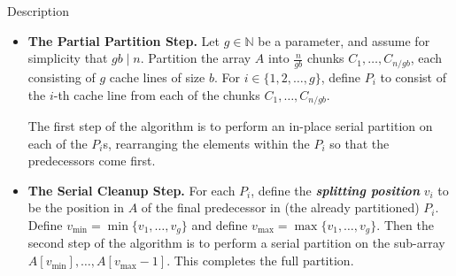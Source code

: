 \documentclass{beamer}
\newcommand{\defn}[1]       {{\textit{\textbf{\boldmath #1}}}}
\begin{document}
\begin{frame}[t]{Description}
\begin{itemize}
\item \textbf{The Partial Partition Step.} Let $g \in \mathbb{N}$ be a
  parameter, and assume for simplicity that $gb \mid n$. Partition the
  array $A$ into $\frac{n}{gb}$ chunks $C_1, \ldots, C_{n / gb}$,
  each consisting of $g$ cache lines of size $b$.
	For $i \in \{1, 2, \ldots, g\}$, define 
  $P_i$ to consist of the $i$-th cache line from each of the
  chunks $C_1, \ldots, C_{n / gb}$. %

  The first step of the algorithm is to perform an in-place serial
  partition on each of the $P_i$s, rearranging the elements within the
  $P_i$ so that the predecessors come first. %
\item \textbf{The Serial Cleanup Step. }For each $P_i$, define the \defn{splitting position} $v_i$ to be
  the position in $A$ of the final predecessor in (the already
  partitioned) $P_i$. Define $v_{\text{min}} = \min\{v_1, \ldots,
  v_{g}\}$ and define $v_{\text{max}} = \max\{v_1, \ldots, v_{g}\}$. Then the
  second step of the algorithm is to perform a serial partition on the
	sub-array \\$A[v_{\text{min}}],\ldots, A[v_{\text{max}}-1]$. This completes the   
    full partition.
\end{itemize}

\end{frame}
\end{document}
